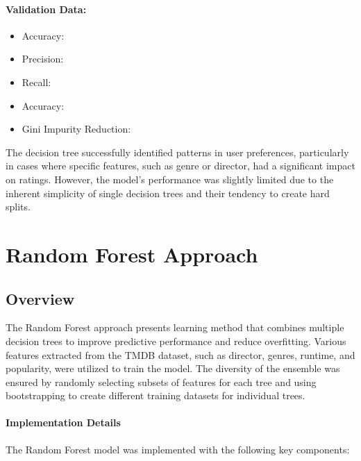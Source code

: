\documentclass[a4paper,10pt]{article}
\begin{document}
\paragraph{Validation Data:}
\begin{itemize}
    \item Accuracy:
    \item Precision:
    \item Recall:
    \item Accuracy:
    \item Gini Impurity Reduction:
\end{itemize}

The decision tree successfully identified patterns
in user preferences, particularly in cases where specific
features, such as genre or director, had a significant
impact on ratings.
However, the model's performance was slightly limited due
to the inherent simplicity of single decision trees and
their tendency to create hard splits.

\section{Random Forest Approach}
\subsection{Overview}
The Random Forest approach presents learning method that
combines multiple decision trees to improve predictive
performance and reduce overfitting.
Various features extracted from the TMDB dataset,
such as director, genres, runtime, and popularity,
were utilized to train the model.
The diversity of the ensemble was ensured by randomly
selecting subsets of features for each tree and using
bootstrapping to create different training datasets for
individual trees.

\paragraph{Implementation Details}
The Random Forest model was implemented with the
following key components:
\end{document}
